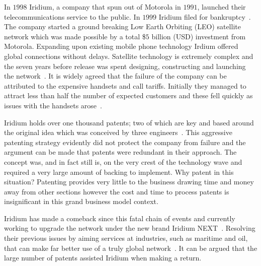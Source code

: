 {}

In $1998$ Iridium, a company that spun out of Motorola in $1991$, launched their telecommunications service to the public.
In $1999$ Iridium filed for bankruptcy~\cite{fink2000iridium}.%
The company started a ground breaking Low Earth Orbiting (LEO) satellite network which was made possible by a total \$$5$ billion (USD) investment from Motorola.
Expanding upon existing mobile phone technology Irdium offered global connections without delays.
Satellite technology is extremely complex and the seven years before release was spent designing, constructing and launching the network~\cite{fink2000iridium}. 
It is widely agreed that the failure of the company can be attributed to the expensive handsets and call tariffs.
Initially they managed to attract less than half the number of expected customers and these fell quickly as issues with the handsets arose~\cite{bill1999}.


Iridium holds over one thousand patents; two of which are key and based around the original idea which was conceived by three engineers~\cite{ip2010,bertiger1995satellite,bertiger1997satellite}.
This aggressive patenting strategy evidently did not protect the company from failure and the argument can be made that patents were redundant in their approach.
The concept was, and in fact still is, on the very crest of the technology wave and required a very large amount of backing to implement.
Why patent in this situation?
Patenting provides very little to the business drawing time and money away from other sections however the cost and time to process patents is insignificant in this grand business model context.


Iridium has made a comeback since this fatal chain of events and currently working to upgrade the network under the new brand Iridium NEXT~\cite{iridiumNEXT}.
Resolving their previous issues by aiming services at industries, such as maritime and oil, that can make far better use of a truly global network~\cite{better2009}.
It can be argued that the large number of patents assisted Iridium when making a return.  

